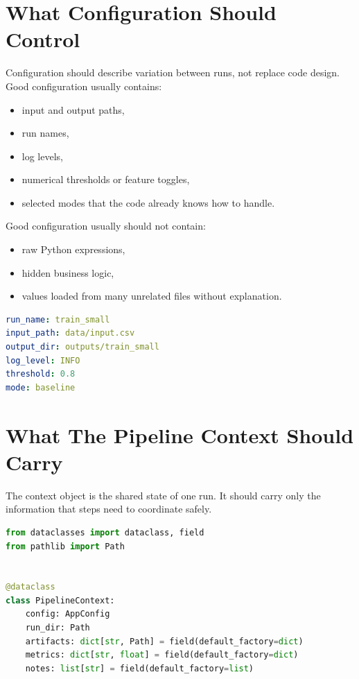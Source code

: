 \documentclass[11pt,oneside]{book}
\begin{document}
\section*{What Configuration Should Control}

Configuration should describe variation between runs, not replace code design.  
Good configuration usually contains:
\begin{itemize}
  \item input and output paths,
  \item run names,
  \item log levels,
  \item numerical thresholds or feature toggles,
  \item selected modes that the code already knows how to handle.
\end{itemize}

Good configuration usually should not contain:
\begin{itemize}
  \item raw Python expressions,
  \item hidden business logic,
  \item values loaded from many unrelated files without explanation.
\end{itemize}

\begin{lstlisting}[style=bookcode,language=yaml]
run_name: train_small
input_path: data/input.csv
output_dir: outputs/train_small
log_level: INFO
threshold: 0.8
mode: baseline
\end{lstlisting}

\section*{What The Pipeline Context Should Carry}

The context object is the shared state of one run.  
It should carry only the information that steps need to coordinate safely.

\begin{lstlisting}[style=bookcode,language=Python]
from dataclasses import dataclass, field
from pathlib import Path


@dataclass
class PipelineContext:
    config: AppConfig
    run_dir: Path
    artifacts: dict[str, Path] = field(default_factory=dict)
    metrics: dict[str, float] = field(default_factory=dict)
    notes: list[str] = field(default_factory=list)
\end{lstlisting}
\end{document}
